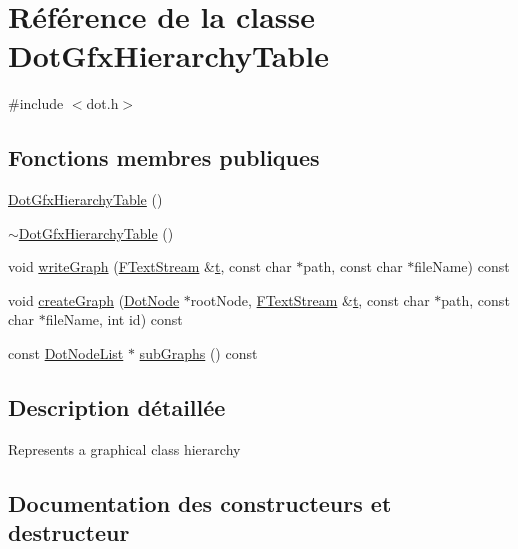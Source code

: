\hypertarget{class_dot_gfx_hierarchy_table}{}\section{Référence de la classe Dot\+Gfx\+Hierarchy\+Table}
\label{class_dot_gfx_hierarchy_table}


{\ttfamily \#include $<$dot.\+h$>$}

\subsection*{Fonctions membres publiques}
\begin{DoxyCompactItemize}
\item 
\hyperlink{class_dot_gfx_hierarchy_table_ac8e97bd9b15acb3a8ae944ae4f658f83}{Dot\+Gfx\+Hierarchy\+Table} ()
\item 
\hyperlink{class_dot_gfx_hierarchy_table_a301614fa0fd8b642790e1f419e748585}{$\sim$\+Dot\+Gfx\+Hierarchy\+Table} ()
\item 
void \hyperlink{class_dot_gfx_hierarchy_table_a39740710bf9635c65ec9e3864abbec11}{write\+Graph} (\hyperlink{class_f_text_stream}{F\+Text\+Stream} \&\hyperlink{058__bracket__recursion_8tcl_a69e959f6901827e4d8271aeaa5fba0fc}{t}, const char $\ast$path, const char $\ast$file\+Name) const 
\item 
void \hyperlink{class_dot_gfx_hierarchy_table_a73d3d9fc8e1d36f260e9788da7cbb869}{create\+Graph} (\hyperlink{class_dot_node}{Dot\+Node} $\ast$root\+Node, \hyperlink{class_f_text_stream}{F\+Text\+Stream} \&\hyperlink{058__bracket__recursion_8tcl_a69e959f6901827e4d8271aeaa5fba0fc}{t}, const char $\ast$path, const char $\ast$file\+Name, int id) const 
\item 
const \hyperlink{class_dot_node_list}{Dot\+Node\+List} $\ast$ \hyperlink{class_dot_gfx_hierarchy_table_a641e7f850a8a9c70941d764b61347da1}{sub\+Graphs} () const 
\end{DoxyCompactItemize}


\subsection{Description détaillée}
Represents a graphical class hierarchy 

\subsection{Documentation des constructeurs et destructeur}
\hypertarget{class_dot_gfx_hierarchy_table_ac8e97bd9b15acb3a8ae944ae4f658f83}{}
